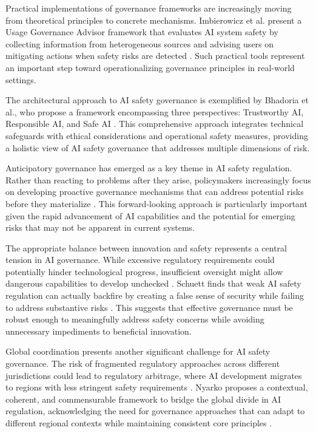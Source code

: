 \documentclass[conference]{IEEEtran}
\begin{document}
Practical implementations of governance frameworks are increasingly moving from theoretical principles to concrete mechanisms. Imbierowicz et al. present a Usage Governance Advisor framework that evaluates AI system safety by collecting information from heterogeneous sources and advising users on mitigating actions when safety risks are detected \cite{2412.01957}. Such practical tools represent an important step toward operationalizing governance principles in real-world settings.

The architectural approach to AI safety governance is exemplified by Bhadoria et al., who propose a framework encompassing three perspectives: Trustworthy AI, Responsible AI, and Safe AI \cite{2408.12935}. This comprehensive approach integrates technical safeguards with ethical considerations and operational safety measures, providing a holistic view of AI safety governance that addresses multiple dimensions of risk.

Anticipatory governance has emerged as a key theme in AI safety regulation. Rather than reacting to problems after they arise, policymakers increasingly focus on developing proactive governance mechanisms that can address potential risks before they materialize \cite{2501.07913}. This forward-looking approach is particularly important given the rapid advancement of AI capabilities and the potential for emerging risks that may not be apparent in current systems.

The appropriate balance between innovation and safety represents a central tension in AI governance. While excessive regulatory requirements could potentially hinder technological progress, insufficient oversight might allow dangerous capabilities to develop unchecked \cite{2503.20848}. Schuett finds that weak AI safety regulation can actually backfire by creating a false sense of security while failing to address substantive risks \cite{2503.20848}. This suggests that effective governance must be robust enough to meaningfully address safety concerns while avoiding unnecessary impediments to beneficial innovation.

Global coordination presents another significant challenge for AI safety governance. The risk of fragmented regulatory approaches across different jurisdictions could lead to regulatory arbitrage, where AI development migrates to regions with less stringent safety requirements \cite{2303.11196}. Nyarko proposes a contextual, coherent, and commensurable framework to bridge the global divide in AI regulation, acknowledging the need for governance approaches that can adapt to different regional contexts while maintaining consistent core principles \cite{2303.11196}.
\end{document}
